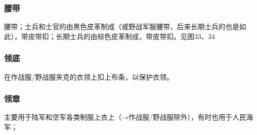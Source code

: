 \subsubsection*{腰带}%

腰带；士兵和士官的由黑色皮革制成（或野战军服腰带，后来长期士兵的也是如此），带皮带扣；长期士兵的由棕色皮革制成，带皮带扣。见图33、34

\subsubsection*{领底}%

在作战服/野战服夹克的衣领上扣上布条，以保护衣领。

\subsubsection*{领章}%

主要用于陆军和空军各类制服上衣上（→作战服/野战服除外），有时也用于人民海军；

